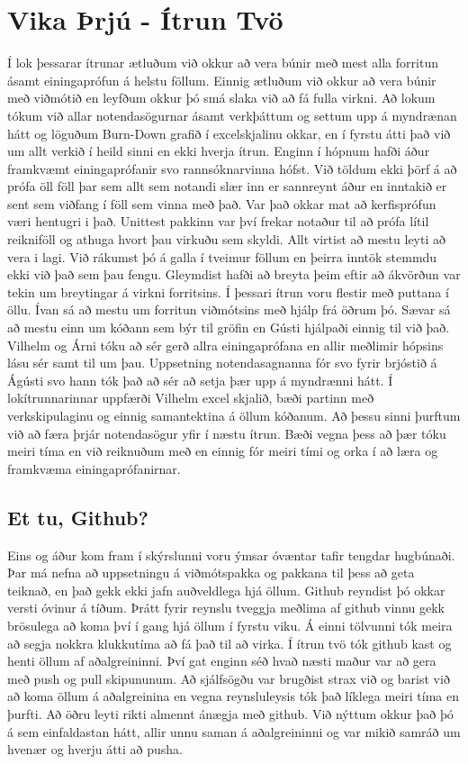 \documentclass[a4paper, 12 pt]{article}
\begin{document}
\section{Vika Þrjú - Ítrun Tvö}
Í lok þessarar ítrunar ætluðum við okkur að vera búnir með mest alla forritun ásamt einingaprófun á helstu föllum.  Einnig ætluðum við okkur að vera búnir með viðmótið en leyfðum okkur þó smá slaka við að fá fulla virkni.  Að lokum tókum við allar notendasögurnar ásamt verkþáttum og settum upp á myndrænan hátt og löguðum Burn-Down grafið í excelskjalinu okkar, en í fyrstu átti það við um allt verkið í heild sinni en ekki hverja ítrun.   
Enginn í hópnum hafði áður framkvæmt einingaprófanir svo rannsóknarvinna hófst.  Við töldum ekki þörf á að prófa öll föll þar sem allt sem notandi slær inn er sannreynt áður en inntakið er sent sem viðfang í föll sem vinna með það.  Var það okkar mat að kerfisprófun væri hentugri i það.  Unittest pakkinn var því frekar notaður til að prófa lítil reikniföll og athuga hvort þau virkuðu sem skyldi.  Allt virtist að mestu leyti að vera i lagi.  Við rákumst þó á galla í tveimur föllum en þeirra inntök stemmdu ekki við það sem þau fengu.  Gleymdist hafði að breyta þeim eftir að ákvörðun var tekin um breytingar á virkni forritsins.  Í þessari ítrun voru flestir með puttana í öllu.  Ívan sá að mestu um forritun viðmótsins með hjálp frá öðrum þó.  Sævar sá að mestu einn um kóðann sem býr til gröfin en Gústi hjálpaði einnig til við það.  Vilhelm og Árni tóku að sér gerð allra einingaprófana en allir meðlimir hópsins lásu sér samt til um þau.  Uppsetning notendasagnanna fór svo fyrir brjóstið á Ágústi svo hann tók það að sér að setja þær upp á myndrænni hátt.  Í lokítrunnarinnar uppfærði Vilhelm excel skjalið, bæði partinn með verkskipulaginu og einnig samantektina á öllum kóðanum.  
Að þessu sinni þurftum við að færa þrjár notendasögur yfir í næstu ítrun.  Bæði vegna þess að þær tóku meiri tíma en við reiknuðum með en einnig fór meiri tími og orka í að læra og framkvæma einingaprófanirnar.

\subsection{Et tu, Github?}
Eins og áður kom fram í skýrslunni voru ýmsar óvæntar tafir tengdar hugbúnaði.  Þar má nefna að uppsetningu á viðmótspakka og pakkana til þess að geta teiknað, en það gekk ekki jafn auðveldlega hjá öllum.  Github reyndist þó okkar versti óvinur á tíðum.  Þrátt fyrir reynslu tveggja meðlima af github vinnu gekk brösulega að koma því í gang hjá öllum í fyrstu viku.  Á einni tölvunni tók meira að segja nokkra klukkutíma að fá það til að virka.  Í ítrun tvö tók github kast og henti öllum af aðalgreininni.  Því gat enginn séð hvað næsti maður var að gera með push og pull skipununum.  Að sjálfsögðu var brugðist strax við og barist við að koma öllum á aðalgreinina en vegna reynsluleysis tók það líklega meiri tíma en þurfti.  Að öðru leyti rikti almennt ánægja með github.  Við nýttum okkur það þó á sem einfaldastan hátt, allir unnu saman á aðalgreininni og var mikið samráð um hvenær og hverju átti að pusha.
\end{document}
